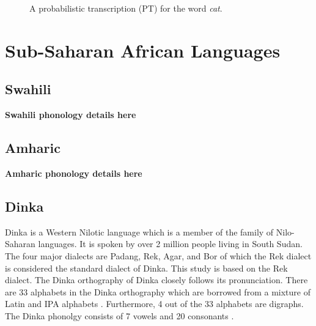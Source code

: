 \documentclass[a4paper]{article}
\newcommand{\mytikzscale}{0.9}
\newcommand{\myvspacefig}{\vspace{-4mm}}
\begin{document}
\begin{figure}
\begin{subfigure}
  \myvspacefig
  \caption{A probabilistic transcription (PT) for the word \emph{cat}.}
  \label{fig:pt}
  \end{subfigure}%
  \vspace{-2mm}
\end{figure}


\section{Sub-Saharan African Languages}  \vspace{-2mm}
\label{sec:Sub-Saharan African Languages}
\subsection{Swahili}  \vspace{-2mm}
\textbf{Swahili phonology details here}
\subsection{Amharic}  \vspace{-2mm}
\textbf{Amharic phonology details here}
\subsection{Dinka}  \vspace{-2mm}
Dinka is a Western Nilotic language which is a member of the family of Nilo-Saharan languages. It is spoken by over 2 million people living in South Sudan. The four major dialects are Padang, Rek, Agar, and Bor of which the Rek dialect is considered the standard dialect of Dinka. This study is based on the Rek dialect. The Dinka orthography of Dinka closely follows its pronunciation. There are 33 alphabets in the Dinka orthography which are borrowed from a mixture of Latin and IPA alphabets \cite{DinkaOmniglot}. Furthermore, 4 out of the 33 alphabets are digraphs. The Dinka phonolgy consists of 7 vowels and 20 consonants \cite{Remijsen-LuanyjangDinka}.
\end{document}
